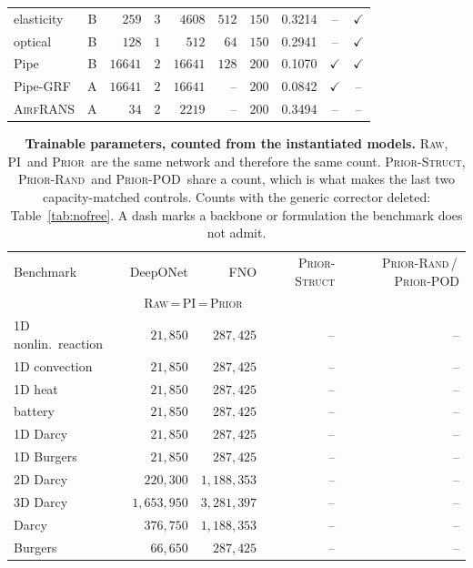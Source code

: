 \documentclass{article}
\newcommand{\armraw}{\textsc{Raw}}
\newcommand{\armpi}{\textsc{PI}}
\newcommand{\armprior}{\textsc{Prior}}
\newcommand{\armstruct}{\textsc{Prior-Struct}}
\newcommand{\armrand}{\textsc{Prior-Rand}}
\newcommand{\armpod}{\textsc{Prior-POD}}
\begin{document}
\begin{table}[t]
\begin{tabular}{lcrrrrr ccc}
elasticity & B & $259$ & $3$ & $4608$ & $512$ & $150$ & 0.3214 & -- & $\checkmark$\\
optical & B & $128$ & $1$ & $512$ & $64$ & $150$ & 0.2941 & -- & $\checkmark$\\
Pipe \citep{li2023fourier} & B & $16641$ & $2$ & $16641$ & $128$ & $200$ & 0.1070 & $\checkmark$ & $\checkmark$\\
Pipe-GRF & A & $16641$ & $2$ & $16641$ & -- & $200$ & 0.0842 & $\checkmark$ & --\\
\textsc{AirfRANS} & A & $34$ & $2$ & $2219$ & -- & $200$ & 0.3494 & -- & --\\
\bottomrule
\end{tabular}
  \vspace{-3mm}
\end{table}

\begin{table}[t]
\centering
\caption{\textbf{Trainable parameters, counted from the instantiated models.} \armraw, \armpi\ and
\armprior\ are the same network and therefore the same count. \armstruct, \armrand\ and \armpod\
share a count, which is what makes the last two capacity-matched controls. Counts with the generic
corrector deleted: Table~\ref{tab:nofree}. A dash marks a backbone or formulation the benchmark
does not admit.}
\label{tab:app-e1-params}
\footnotesize
\setlength{\tabcolsep}{10pt}
\renewcommand{\arraystretch}{0.7}
\begin{tabular}{lrrrr}
\toprule
Benchmark & DeepONet & FNO & \armstruct & \armrand\,/\,\armpod\\
& \multicolumn{2}{c}{\armraw\,=\,\armpi\,=\,\armprior} & &\\
\midrule
1D nonlin.\ reaction & $21{,}850$ & $287{,}425$ & -- & --\\
1D convection & $21{,}850$ & $287{,}425$ & -- & --\\
1D heat & $21{,}850$ & $287{,}425$ & -- & --\\
battery & $21{,}850$ & $287{,}425$ & -- & --\\
1D Darcy & $21{,}850$ & $287{,}425$ & -- & --\\
1D Burgers & $21{,}850$ & $287{,}425$ & -- & --\\
2D Darcy & $220{,}300$ & $1{,}188{,}353$ & -- & --\\
3D Darcy & $1{,}653{,}950$ & $3{,}281{,}397$ & -- & --\\
Darcy \citep{li2020fourier} & $376{,}750$ & $1{,}188{,}353$ & -- & --\\
Burgers \citep{li2020fourier} & $66{,}650$ & $287{,}425$ & -- & --\\

\end{tabular}
\end{table}
\end{document}
